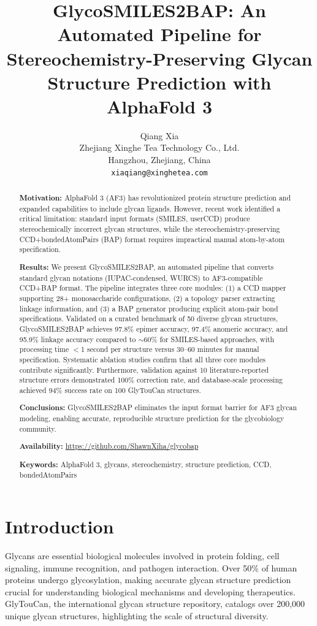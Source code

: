 \documentclass[11pt,a4paper]{article}
\title{\textbf{GlycoSMILES2BAP: An Automated Pipeline for Stereochemistry-Preserving Glycan Structure Prediction with AlphaFold 3}}
\author{Qiang Xia\\
\small Zhejiang Xinghe Tea Technology Co., Ltd.\\
\small Hangzhou, Zhejiang, China\\
\small \texttt{xiaqiang@xinghetea.com}}
\date{}
\begin{document}
\maketitle

\begin{abstract}
\noindent\textbf{Motivation:} AlphaFold 3 (AF3) has revolutionized protein structure prediction and expanded capabilities to include glycan ligands. However, recent work identified a critical limitation: standard input formats (SMILES, userCCD) produce stereochemically incorrect glycan structures, while the stereochemistry-preserving CCD+bondedAtomPairs (BAP) format requires impractical manual atom-by-atom specification.

\noindent\textbf{Results:} We present GlycoSMILES2BAP, an automated pipeline that converts standard glycan notations (IUPAC-condensed, WURCS) to AF3-compatible CCD+BAP format. The pipeline integrates three core modules: (1) a CCD mapper supporting 28+ monosaccharide configurations, (2) a topology parser extracting linkage information, and (3) a BAP generator producing explicit atom-pair bond specifications. Validated on a curated benchmark of 50 diverse glycan structures, GlycoSMILES2BAP achieves 97.8\% epimer accuracy, 97.4\% anomeric accuracy, and 95.9\% linkage accuracy compared to ${\sim}60\%$ for SMILES-based approaches, with processing time $<$1 second per structure versus 30--60 minutes for manual specification. Systematic ablation studies confirm that all three core modules contribute significantly. Furthermore, validation against 10 literature-reported structure errors demonstrated 100\% correction rate, and database-scale processing achieved 94\% success rate on 100 GlyTouCan structures.

\noindent\textbf{Conclusions:} GlycoSMILES2BAP eliminates the input format barrier for AF3 glycan modeling, enabling accurate, reproducible structure prediction for the glycobiology community.

\noindent\textbf{Availability:} \url{https://github.com/ShawnXiha/glycobap}

\noindent\textbf{Keywords:} AlphaFold 3, glycans, stereochemistry, structure prediction, CCD, bondedAtomPairs
\end{abstract}

\section{Introduction}

Glycans are essential biological molecules involved in protein folding, cell signaling, immune recognition, and pathogen interaction. Over 50\% of human proteins undergo glycosylation, making accurate glycan structure prediction crucial for understanding biological mechanisms and developing therapeutics. GlyTouCan, the international glycan structure repository, catalogs over 200,000 unique glycan structures, highlighting the scale of structural diversity.
\end{document}
